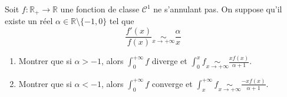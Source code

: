 \documentclass[french,a4paper]{article}
\newcommand{\R}{\mathbb{R}}
\theoremstyle{plain}
\theoremstyle{definition}
\theoremstyle{remark}
\begin{document}
\begin{ex}[Moulin.IG.63 / X]{}
	Soit $f:\R_+\to\R$ une fonction de classe $\mathcal{C}^1$ ne s'annulant pas. On suppose qu'il existe un réel $\alpha\in\R\setminus\{-1,0\}$ tel que $$\frac{f'(x)}{f(x)}\underset{x\to+\infty}{\sim}\frac{\alpha}{x}$$
	\begin{enumerate}
		\item Montrer que si $\alpha>-1$, alors $\displaystyle\int_{0}^{+\infty}f$ diverge et $\displaystyle\int_{0}^{x}f\underset{x\to+\infty}{\sim}\frac{xf(x)}{\alpha+1}$.
		\item Montrer que si $\alpha<-1$, alors $\displaystyle\int_{0}^{+\infty}f$ converge et $\displaystyle\int_{x}^{+\infty}f\underset{x\to+\infty}{\sim}\frac{-xf(x)}{\alpha+1}$.
	\end{enumerate}
\end{ex}
\end{document}
